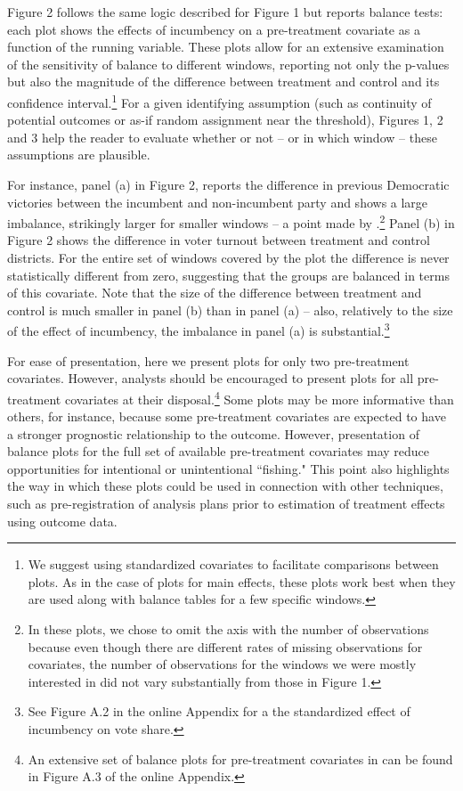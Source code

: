 \documentclass[letterpaper,twoside,12pt]{article}\usepackage[]{graphicx}\usepackage[]{color}
\begin{document}
Figure 2 follows the same logic described for Figure 1 but reports balance tests: each plot shows the effects of incumbency on a pre-treatment covariate as a function of the running variable. These plots allow for an extensive examination of the sensitivity of balance to different windows, reporting not only the p-values but also the magnitude of the difference between treatment and control and its confidence interval.\footnote{We suggest using standardized covariates to facilitate comparisons between plots. As in the case of plots for main effects, these plots work best when they are used along with balance tables for a few specific windows.} For a given identifying assumption (such as continuity of potential outcomes or as-if random assignment near the threshold), Figures 1, 2 and 3 help the reader to evaluate whether or not -- or in which window -- these assumptions are plausible.

For instance, panel (a) in Figure 2, reports the difference in previous Democratic  victories between the incumbent and non-incumbent party and shows a large imbalance, strikingly larger for smaller windows -- a point made by \citet{caughey2011elections}.\footnote{In these plots, we chose to omit the axis with the number of observations because even though there are different rates of missing observations for covariates, the number of observations for the windows we were mostly interested in did not vary substantially from those in Figure 1.} Panel (b) in Figure 2 shows the difference in voter turnout between treatment and control districts. For the entire set of windows covered by the plot the difference is never statistically different from zero, suggesting that the groups are balanced in terms of this covariate. Note that the size of the difference between treatment and control is much smaller in panel (b) than in panel (a) -- also, relatively to the size of the effect of incumbency, the imbalance in panel (a) is substantial.\footnote{See Figure A.2 in the online Appendix for a the standardized effect of incumbency on vote share.}

For ease of presentation, here we present plots for only two pre-treatment covariates.  However, analysts should be encouraged to present plots for all pre-treatment covariates at their disposal.\footnote{An extensive set of balance plots for pre-treatment covariates in \citet{caughey2011elections} can be found in Figure A.3 of the online Appendix.} Some plots may be more informative than others, for instance, because some pre-treatment covariates are expected to have a stronger prognostic relationship to the outcome. However, presentation of balance plots for the full set of available pre-treatment covariates may reduce opportunities for intentional or unintentional ``fishing." This point also highlights the way in which these plots could be used in connection with other techniques, such as pre-registration of analysis plans prior to estimation of treatment effects using outcome data.
\end{document}

